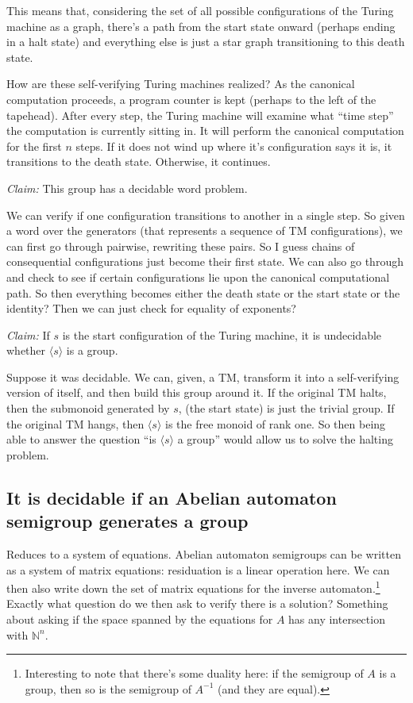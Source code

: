 \documentclass[10pt]{article}
\begin{document}
This means that, considering the set of all possible configurations of
the Turing machine as a graph, there's a path from the start state
onward (perhaps ending in a halt state) and everything else is just a
star graph transitioning to this death state.

How are these self-verifying Turing machines realized? As the
canonical computation proceeds, a program counter is kept (perhaps to
the left of the tapehead). After every step, the Turing machine will
examine what ``time step'' the computation is currently sitting in. It
will perform the canonical computation for the first $n$ steps. If it
does not wind up where it's configuration says it is, it transitions
to the death state. Otherwise, it continues.

\textit{Claim:} This group has a decidable word problem.

We can verify if one configuration transitions to another in a single
step. So given a word over the generators (that represents a sequence
of TM configurations), we can first go through pairwise, rewriting
these pairs. So I guess chains of consequential configurations just
become their first state. We can also go through and check to see if
certain configurations lie upon the canonical computational path. So
then everything becomes either the death state or the start state or
the identity? Then we can just check for equality of exponents?

\textit{Claim:} If $s$ is the start configuration of the Turing
machine, it is undecidable whether $\langle s \rangle$ is a group.

Suppose it was decidable. We can, given, a TM, transform it into a
self-verifying version of itself, and then build this group around
it. If the original TM halts, then the submonoid generated by $s$,
(the start state) is just the trivial group. If the original TM hangs,
then $\langle s \rangle$ is the free monoid of rank one. So then being
able to answer the question ``is $\langle s \rangle $ a group'' would
allow us to solve the halting problem.

\subsection{It is decidable if an Abelian automaton semigroup
  generates a group}

Reduces to a system of equations. Abelian automaton semigroups can be
written as a system of matrix equations: residuation is a linear
operation here. We can then also write down the set of matrix
equations for the inverse automaton.\footnote{Interesting to note that
  there's some duality here: if the semigroup of $A$ is a group, then
  so is the semigroup of $A^{-1}$ (and they are equal).}  Exactly what
question do we then ask to verify there is a solution? Something about
asking if the space spanned by the equations for $A$ has any
intersection with $\mathbb{N}^n$.
\end{document}
